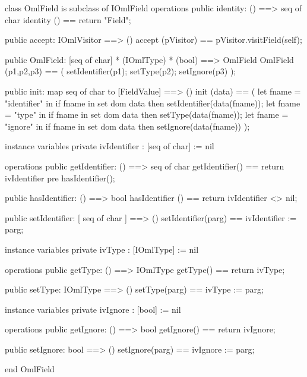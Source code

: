 \begin{vdm_al}
class OmlField is subclass of IOmlField
operations
  public identity: () ==> seq of char
  identity () == return "Field";

  public accept: IOmlVisitor ==> ()
  accept (pVisitor) == pVisitor.visitField(self);

  public OmlField:
      [seq of char] *
      (IOmlType) *
      (bool) ==> OmlField
  OmlField (p1,p2,p3) == 
   ( setIdentifier(p1);
     setType(p2);
     setIgnore(p3) );

  public init: map seq of char to [FieldValue] ==> ()
  init (data) ==
    ( let fname = "identifier" in
        if fname in set dom data
        then setIdentifier(data(fname));
      let fname = "type" in
        if fname in set dom data
        then setType(data(fname));
      let fname = "ignore" in
        if fname in set dom data
        then setIgnore(data(fname)) );

instance variables
  private ivIdentifier : [seq of char] := nil

operations
  public getIdentifier: () ==> seq of char
  getIdentifier() == return ivIdentifier
    pre hasIdentifier();

  public hasIdentifier: () ==> bool
  hasIdentifier () == return ivIdentifier <> nil;

  public setIdentifier: [ seq of char ] ==> ()
  setIdentifier(parg) == ivIdentifier := parg;

instance variables
  private ivType : [IOmlType] := nil

operations
  public getType: () ==> IOmlType
  getType() == return ivType;

  public setType: IOmlType ==> ()
  setType(parg) == ivType := parg;

instance variables
  private ivIgnore : [bool] := nil

operations
  public getIgnore: () ==> bool
  getIgnore() == return ivIgnore;

  public setIgnore: bool ==> ()
  setIgnore(parg) == ivIgnore := parg;

end OmlField
\end{vdm_al}

